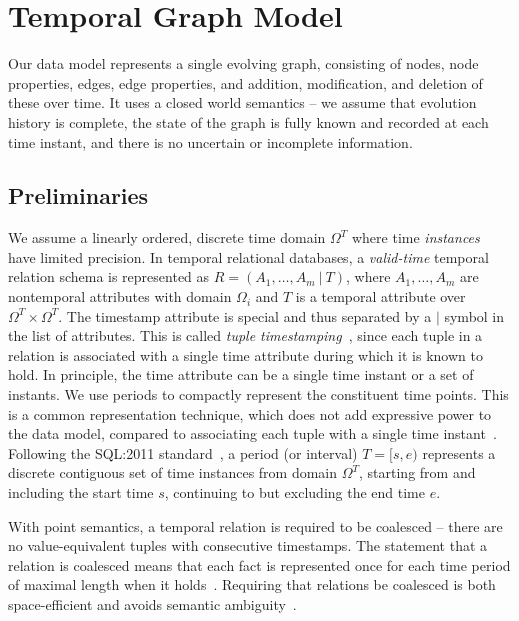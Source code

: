 \section{Temporal Graph Model}
\label{sec:model}

Our data model represents a single evolving graph, consisting of
nodes, node properties, edges, edge properties, and addition,
modification, and deletion of these over time.  It uses a closed world
semantics -- we assume that evolution history is complete, the state
of the graph is fully known and recorded at each time instant, and
there is no uncertain or incomplete information.

\subsection{Preliminaries}

We assume a linearly ordered, discrete time domain $\Omega^T$ where
time {\em instances} have limited precision.  In temporal relational
databases, a {\em valid-time} temporal relation schema is represented
as $R = (A_1, \ldots, A_m~|~T)$, where $A_1, \ldots, A_m$ are
nontemporal attributes with domain $\Omega_i$ and $T$ is a temporal
attribute over $\Omega^T \times \Omega^T$.  The timestamp attribute is
special and thus separated by a $|$ symbol in the list of attributes.
This is called {\em tuple
  timestamping}~\cite{Montanari2009}, since each tuple in a relation
is associated with a single time attribute during which it is known to
hold.  In principle, the time attribute can be a single time instant
or a set of instants.  We use periods to compactly represent the
constituent time points.  This is a common representation technique,
which does not add expressive power to the data model, compared to
associating each tuple with a single time
instant~\cite{DBLP:conf/ictl/Chomicki94}.  Following the SQL:2011
standard~\cite{DBLP:journals/sigmod/KulkarniM12}, a period (or
interval) $T = [s, e)$ represents a discrete contiguous set of time
  instances from domain $\Omega^T$, starting from and including the
  start time $s$, continuing to but excluding the end time $e$.

With point semantics, a temporal relation is required to be coalesced
-- there are no value-equivalent tuples with consecutive timestamps.
The statement that a relation is coalesced means that each fact is
represented once for each time period of maximal length when it
holds~\cite{DBLP:conf/vldb/BohlenSS96}.  Requiring that relations be
coalesced is both space-efficient and avoids semantic
ambiguity~\cite{DBLP:reference/db/JensenS09k}.

